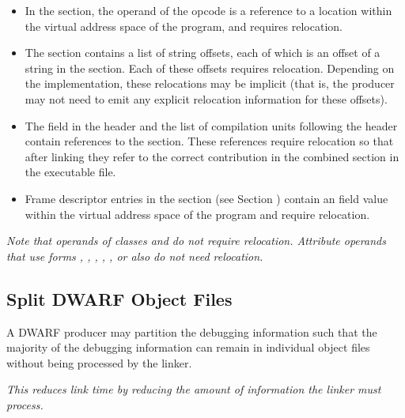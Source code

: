 \begin{itemize}
\item In the \dotdebugline{} section, the operand of the \DWLNEsetaddress{}
opcode is a reference to a location within the virtual address space
of the program, and requires relocation.

\item The \dotdebugstroffsets{} section contains a list of string offsets,
each of which is an offset of a string in the \dotdebugstr{} section. Each
of these offsets requires relocation. Depending on the implementation,
these relocations may be implicit (that is, the producer may not need to
emit any explicit relocation information for these offsets).

\item The \HFNdebuginfooffset{} field in the \dotdebugaranges{} header and 
the list of compilation units following the \dotdebugnames{} header contain 
references to the \dotdebuginfo{} section.  These references require relocation 
so that after linking they refer to the correct contribution in the combined 
\dotdebuginfo{} section in the executable file.

\item Frame descriptor entries in the \dotdebugframe{} section 
(see Section ) contain an 
\HFNinitiallocation{} field value within the virtual address 
space of the program and require relocation. 

\end{itemize}

\textit{Note that operands of classes 
\CLASSconstant{} and 
\CLASSflag{} do not require relocation. Attribute operands that use 
forms \DWFORMstring{},
\DWFORMrefone, \DWFORMreftwo, \DWFORMreffour, \DWFORMrefeight, or
\DWFORMrefudata{} also do not need relocation.}

\subsection{Split DWARF Object Files}
\label{datarep:splitdwarfobjectfiles}
A DWARF producer may partition the debugging
information such that the majority of the debugging
information can remain in individual object files without
being processed by the linker. 

\textit{This reduces link time by reducing the amount of information
the linker must process.}

